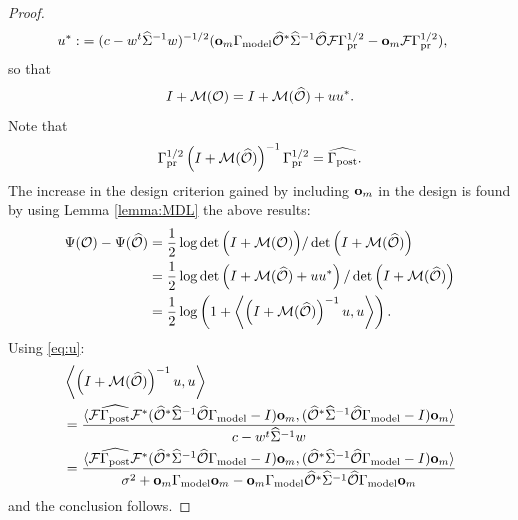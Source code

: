 \documentclass{amsart}
\numberwithin{equation}{section}
\begin{document}
\begin{proof}
\begin{align}
\begin{split}
      u^* :&=  (c -w^t \widehat{\Sigma}^{-1} w )^{-1/2} (\mathbf{o}_m \Gamma_{\textup{model}} \widehat{\mathcal{O}}^* \widehat{\Sigma}^{-1} \widehat{\mathcal{O}} \mathcal{F} \Gamma_{\textup{pr}}^{1/2} - \mathbf{o}_m \mathcal{F} \Gamma_{\textup{pr}}^{1/2} ),
    \end{split}
  \end{align}
  so that
  \begin{equation}\label{eq:M plus I}
    I + \mathcal{M}( \mathcal{O} ) = I + \mathcal{M} (\widehat{\mathcal{O}} ) + uu^*.
  \end{equation}
  Note that
  \begin{equation}\label{eq:M postcov}
    \Gamma_{\textup{pr}}^{1/2} \left (I + \mathcal{M}( \widehat{\mathcal{O}} ) \right )^{-1} \Gamma_{\textup{pr}}^{1/2} = \widehat{\Gamma_{\textup{post}}}.
  \end{equation}
  The increase in the design criterion gained by including $\mathbf{o}_m$
  in the design is found by using Lemma \ref{lemma:MDL} the above
  results:
  \begin{align*}
    \Psi( \mathcal{O} ) - \Psi( \widehat{\mathcal{O}} )
    &= \frac12 \log \det \Big ( I + \mathcal{M} ( \mathcal{O} ) \Big ) / \det \Big ( I + \mathcal{M} (\widehat{\mathcal{O}}) \Big ) \\
    &= \frac12  \log \det \left ( I + \mathcal{M}(\widehat{\mathcal{O}}) + uu^* \right ) / \det \Big ( I + \mathcal{M} (\widehat{\mathcal{O}}) \Big ) \\
    &= \frac12 \log \left ( 1 + \left \langle \left ( I+\mathcal{M}(\widehat{\mathcal{O}}) \right )^{-1} u, u  \right \rangle \right ).
  \end{align*}
  Using \eqref{eq:u}:
  \begin{align*}
    &\left \langle \left (I+\mathcal{M} (\widehat{\mathcal{O}})\right )^{-1}u, u \right \rangle\\
    &= \frac{
      \langle \mathcal{F} \widehat{\Gamma_{\textup{post}}} \mathcal{F}^* (\widehat{\mathcal{O}}^* \widehat{\Sigma}^{-1} \widehat{\mathcal{O}} \Gamma_{\textup{model}} - I ) \mathbf{o}_m,
      (\widehat{\mathcal{O}}^* \widehat{\Sigma}^{-1} \widehat{\mathcal{O}} \Gamma_{\textup{model}} - I ) \mathbf{o}_m \rangle
    }{
      c- w^t \widehat{\Sigma}^{-1} w
    }\\
    &= 
    \frac{
      \langle \mathcal{F} \widehat{\Gamma_{\textup{post}}} \mathcal{F}^* (\widehat{\mathcal{O}}^* \widehat{\Sigma}^{-1} \widehat{\mathcal{O}} \Gamma_{\textup{model}} - I ) \mathbf{o}_m,
      (\widehat{\mathcal{O}}^* \widehat{\Sigma}^{-1} \widehat{\mathcal{O}} \Gamma_{\textup{model}} - I ) \mathbf{o}_m \rangle
    }{
      \sigma^2 + \mathbf{o}_m \Gamma_{\textup{model}} \mathbf{o}_m - \mathbf{o}_m \Gamma_{\textup{model}} \widehat{\mathcal{O}}^* \widehat{\Sigma}^{-1} \widehat{\mathcal{O}} \Gamma_{\textup{model}} \mathbf{o}_m 
    }
  \end{align*}
  and the conclusion follows.
\end{proof}
\end{document}
